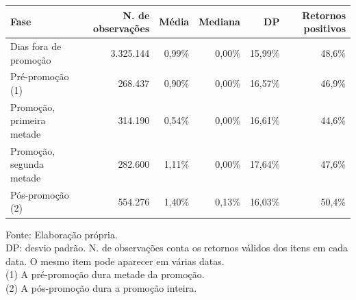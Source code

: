 \begingroup
\setlength{}
\setlength{}
\fontsize{9.5pt}{11.4pt}\selectfont

\setlength{\LTpost}{0mm}
\begin{longtable}{@{\extracolsep{\fill}}lrrrrr}

\toprule
\textbf{Fase} & \textbf{N. de observações} & \textbf{Média} & \textbf{Mediana} & \textbf{DP} & \textbf{Retornos positivos} \\ 
\midrule\addlinespace[2.5pt]
Dias fora de promoção & 3.325.144 & 0,99\% & 0,00\% & 15,99\% & 48,6\% \\
Pré-promoção (1) & 268.437 & 0,90\% & 0,00\% & 16,57\% & 46,9\% \\
Promoção, primeira metade & 314.190 & 0,54\% & 0,00\% & 16,61\% & 44,6\% \\
Promoção, segunda metade & 282.600 & 1,11\% & 0,00\% & 17,64\% & 47,6\% \\
Pós-promoção (2) & 554.276 & 1,40\% & 0,13\% & 16,03\% & 50,4\% \\
\bottomrule
\end{longtable}
\begin{minipage}{\linewidth}
Fonte: Elaboração própria.\\
DP: desvio padrão. N. de observações conta os retornos válidos dos itens em cada data. O mesmo item pode aparecer em várias datas.\\
(1) A pré-promoção dura metade da promoção.\\
(2) A pós-promoção dura a promoção inteira.\\
\end{minipage}
\endgroup
